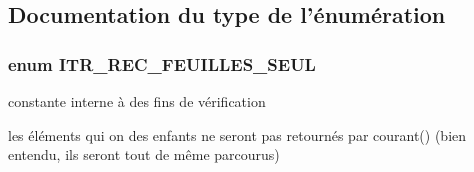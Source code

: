 \subsection{Documentation du type de l'énumération}
\subsubsection{\setlength{\rightskip}{0pt plus 5cm}enum {\bf ITR\_\-REC\_\-FEUILLES\_\-SEUL}}\label{_iterateur_recursif_8php_9e8bb901efc29d22a16161249c16a29d}


constante interne à des fins de vérification 

les éléments qui on des enfants ne seront pas retournés par courant() (bien entendu, ils seront tout de même parcourus) 
